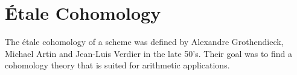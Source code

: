 \section{\'Etale Cohomology}
The \'etale cohomology of a scheme was defined by Alexandre Grothendieck, Michael Artin and Jean-Luis Verdier in the late 50's.
Their goal was to find a cohomology theory that is suited for arithmetic applications.